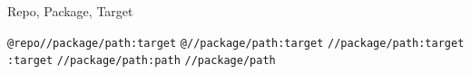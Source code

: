 \documentclass[aspectratio=169]{beamer}
\begin{document}
{
\begin{frame}[plain]
\end{frame}
}

\begin{frame}{Repo, Package, Target}
\begin{center}
\begin{overprint}
 \huge{\texttt{@repo//package/path:target}}
 \huge{\texttt{@//package/path:target}}
\huge{\texttt{//package/path:target}}
\huge{\texttt{:target}}
\huge{\texttt{//package/path:path}}
\huge{\texttt{//package/path}}
\end{overprint}
\end{center}
\end{frame}

{
\begin{frame}[plain]
\end{frame}
}
\end{document}
